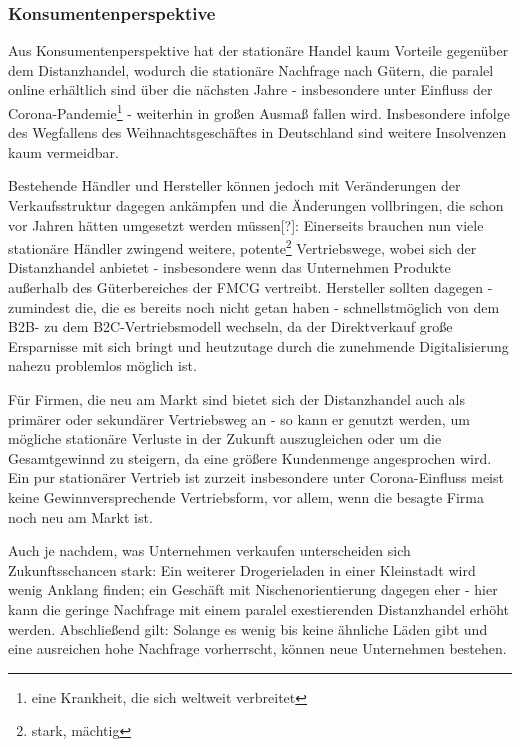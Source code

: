 \subsubsection{Konsumentenperspektive}
Aus Konsumentenperspektive hat der stationäre Handel kaum Vorteile gegenüber dem Distanzhandel, wodurch die stationäre Nachfrage nach Gütern, die paralel online erhältlich sind über die nächsten Jahre - insbesondere unter Einfluss der Corona-Pandemie\footnote{eine Krankheit, die sich weltweit verbreitet} - weiterhin in großen Ausmaß fallen wird. Insbesondere infolge des Wegfallens des Weihnachtsgeschäftes in Deutschland sind weitere Insolvenzen kaum vermeidbar.

Bestehende Händler und Hersteller können jedoch mit Veränderungen der Verkaufsstruktur dagegen ankämpfen und die Änderungen vollbringen, die schon vor Jahren hätten umgesetzt werden müssen[?]: Einerseits brauchen nun viele stationäre Händler zwingend weitere, potente\footnote{stark, mächtig} Vertriebswege, wobei sich der Distanzhandel anbietet - insbesondere wenn das Unternehmen Produkte außerhalb des Güterbereiches der \ac{FMCG} vertreibt. Hersteller sollten dagegen - zumindest die, die es bereits noch nicht getan haben - schnellstmöglich von dem \ac{B2B}- zu dem \ac{B2C}-Vertriebsmodell wechseln, da der Direktverkauf große Ersparnisse mit sich bringt und heutzutage durch die zunehmende Digitalisierung nahezu problemlos möglich ist.

Für Firmen, die neu am Markt sind bietet sich der Distanzhandel auch als primärer oder sekundärer Vertriebsweg an - so kann er genutzt werden, um mögliche stationäre Verluste in der Zukunft auszugleichen oder um die Gesamtgewinnd zu steigern, da eine größere Kundenmenge angesprochen wird. Ein pur stationärer Vertrieb ist zurzeit insbesondere unter Corona-Einfluss meist keine Gewinnversprechende Vertriebsform, vor allem, wenn die besagte Firma noch neu am Markt ist.

Auch je nachdem, was Unternehmen verkaufen unterscheiden sich Zukunftsschancen stark: Ein weiterer Drogerieladen in einer Kleinstadt wird wenig Anklang finden; ein Geschäft mit Nischenorientierung dagegen eher - hier kann die geringe Nachfrage mit einem paralel exestierenden Distanzhandel erhöht werden. %
Abschließend gilt: Solange es wenig bis keine ähnliche Läden gibt und eine ausreichen hohe Nachfrage vorherrscht, können neue Unternehmen bestehen.

